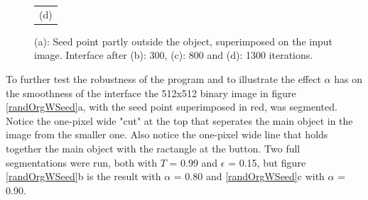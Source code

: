 \begin{figure}[h!]
\begin{minipage}{.49\textwidth}
\begin{tabular}{c}
(d)
\end{tabular}
\end{minipage}
\caption{(a): Seed point partly outside the object, superimposed on the input image. Interface after (b): 300, (c): 800 and (d): 1300 iterations.}
\label{circleZeroMany}
\end{figure}

To further test the robustness of the program and to illustrate the effect $\alpha$ has on the smoothness of the interface the 512x512 binary image in figure \ref{randOrgWSeed}a, with the seed point superimposed in red, was segmented. Notice the one-pixel wide "cut" at the top that seperates the main object in the image from the smaller one. Also notice the one-pixel wide line that holds together the main object with the ractangle at the button. Two full segmentations were run, both with $T$ = 0.99 and $\epsilon$ = 0.15, but figure \ref{randOrgWSeed}b is the result with $\alpha$ = 0.80 and \ref{randOrgWSeed}c with $\alpha$ = 0.90.
